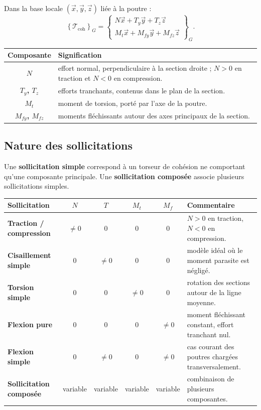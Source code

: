 Dans la base locale $(\vec x,\vec y,\vec z)$ liée à la poutre :
\[
\left\{\mathcal T_{\mathrm{coh}}\right\}_G=
\left\{
\begin{array}{c}
N\vec x+T_y\vec y+T_z\vec z\\[1mm]
M_t\vec x+M_{fy}\vec y+M_{fz}\vec z
\end{array}
\right\}_G.
\]

\begin{center}
\small
\begin{tabularx}{\linewidth}{>{\bfseries}c X}
\toprule
Composante & Signification \\
\midrule
$N$ & effort normal, perpendiculaire à la section droite ; $N>0$ en traction et $N<0$ en compression.\\
$T_y$, $T_z$ & efforts tranchants, contenus dans le plan de la section.\\
$M_t$ & moment de torsion, porté par l'axe de la poutre.\\
$M_{fy}$, $M_{fz}$ & moments fléchissants autour des axes principaux de la section.\\
\bottomrule
\end{tabularx}
\end{center}

\subsection{Nature des sollicitations}

Une \textbf{sollicitation simple} correspond à un torseur de cohésion ne comportant qu'une composante principale. Une \textbf{sollicitation composée} associe plusieurs sollicitations simples.

\begin{center}
\small
\begin{tabularx}{\linewidth}{>{\bfseries}l c c c c X}
\toprule
Sollicitation & $N$ & $T$ & $M_t$ & $M_f$ & Commentaire \\
\midrule
Traction / compression & $\neq0$ & 0 & 0 & 0 & $N>0$ en traction, $N<0$ en compression.\\
Cisaillement simple & 0 & $\neq0$ & 0 & 0 & modèle idéal où le moment parasite est négligé.\\
Torsion simple & 0 & 0 & $\neq0$ & 0 & rotation des sections autour de la ligne moyenne.\\
Flexion pure & 0 & 0 & 0 & $\neq0$ & moment fléchissant constant, effort tranchant nul.\\
Flexion simple & 0 & $\neq0$ & 0 & $\neq0$ & cas courant des poutres chargées transversalement.\\
Sollicitation composée & variable & variable & variable & variable & combinaison de plusieurs composantes.\\
\bottomrule
\end{tabularx}
\end{center}

